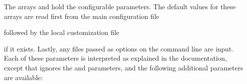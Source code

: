 The arrays  and  hold the
configurable parameters.  The default values for these arrays are read
first from the main configuration file
\begin{quote}
\end{quote}
followed by the local customization file
\begin{quote}
\end{quote}
if it exists.  Lastly, any files passed as  options on the
command line are input.  Each of these parameters is interpreted as
explained in the 
documentation, except that  ignores the
 and 
parameters, and the following additional parameters are available:
